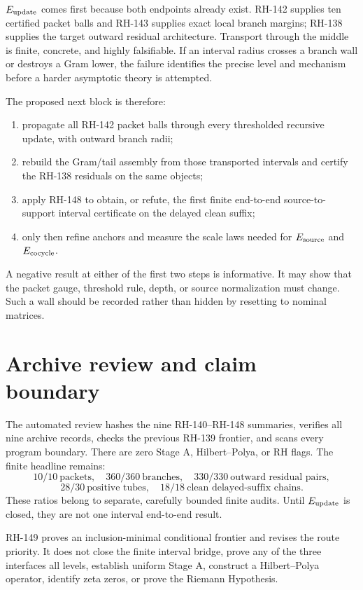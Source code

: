 \documentclass[12pt]{article}
\begin{document}
$E_{\rm update}$ comes first because both endpoints already exist.  RH-142
supplies ten certified packet balls and RH-143 supplies exact local branch
margins; RH-138 supplies the target outward residual architecture.  Transport
through the middle is finite, concrete, and highly falsifiable.  If an
interval radius crosses a branch wall or destroys a Gram lower, the failure
identifies the precise level and mechanism before a harder asymptotic theory
is attempted.

The proposed next block is therefore:
\begin{enumerate}
\item propagate all RH-142 packet balls through every thresholded recursive
update, with outward branch radii;
\item rebuild the Gram/tail assembly from those transported intervals and
certify the RH-138 residuals on the same objects;
\item apply RH-148 to obtain, or refute, the first finite end-to-end
source-to-support interval certificate on the delayed clean suffix;
\item only then refine anchors and measure the scale laws needed for
$E_{\rm source}$ and $E_{\rm cocycle}$.
\end{enumerate}

A negative result at either of the first two steps is informative.  It may
show that the packet gauge, threshold rule, depth, or source normalization
must change.  Such a wall should be recorded rather than hidden by resetting
to nominal matrices.

\section{Archive review and claim boundary}
The automated review hashes the nine RH-140--RH-148 summaries, verifies all
nine archive records, checks the previous RH-139 frontier, and scans every
program boundary.  There are zero Stage A, Hilbert--Polya, or RH flags.  The
finite headline remains:
\[
 10/10\ \text{packets},\quad
 360/360\ \text{branches},\quad
 330/330\ \text{outward residual pairs},
\]
\[
 28/30\ \text{positive tubes},\quad
 18/18\ \text{clean delayed-suffix chains}.
\]
These ratios belong to separate, carefully bounded finite audits.  Until
$E_{\rm update}$ is closed, they are not one interval end-to-end result.

RH-149 proves an inclusion-minimal conditional frontier and revises the route
priority.  It does not close the finite interval bridge, prove any of the
three interfaces all levels, establish uniform Stage A, construct a
Hilbert--Polya operator, identify zeta zeros, or prove the Riemann Hypothesis.



\end{document}
